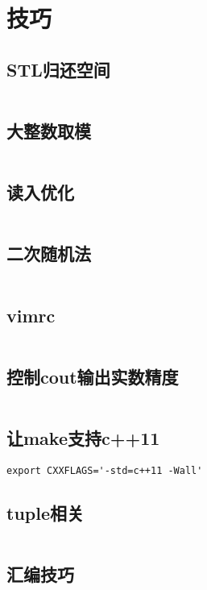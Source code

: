\section{技巧}
\subsection{STL归还空间}
\inputminted{cpp}{\source/tricks/truly-release-container-space.cpp}
\subsection{大整数取模}
\inputminted{cpp}{\source/tricks/O1-multiply-mod.cpp}
\subsection{读入优化}
\inputminted{cpp}{\source/tricks/unbeatable-input-acceleration.cpp}
\subsection{二次随机法}
\inputminted{cpp}{\source/tricks/mersenne-twister.cpp}
\subsection{vimrc}
\inputminted{cpp}{\source/tricks/vimrc}
\subsection{控制cout输出实数精度}
\inputminted{cpp}{\source/tricks/control-cout-precision.cpp}
\subsection{让make支持c++11}
\begin{verbatim}
export CXXFLAGS='-std=c++11 -Wall'
\end{verbatim}
\subsection{tuple相关}
\inputminted{cpp}{\source/tricks/tuple.cpp}
\subsection{汇编技巧}
\inputminted{cpp}{\source/tricks/tech.cpp}
